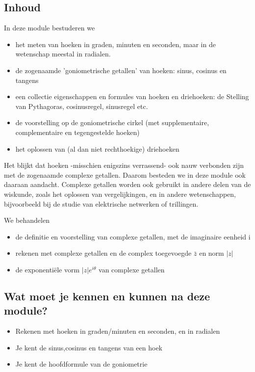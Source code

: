 \documentclass{ximera}
\begin{document}
\subsection{Inhoud}
\begin{expandable}
In deze module bestuderen we 
	\begin{itemize}
		\item het meten van hoeken in graden, minuten en seconden, maar in de wetenschap meestal in radialen.
        	\item de zogenaamde 'goniometrische getallen' van hoeken: sinus, cosinus en tangens
	    	\item een collectie eigenschappen en formules van hoeken en driehoeken: de Stelling van Pythagoras, cosinusregel, sinusregel etc.
        	\item de voorstelling op de goniometrische cirkel (met supplementaire, complementaire en tegengestelde hoeken)
	   	\item het oplossen van (al dan niet rechthoekige) driehoeken
	\end{itemize}

Het blijkt dat hoeken -misschien enigszins verrassend-  ook nauw verbonden zijn met de zogenaamde complexe getallen. Daarom besteden we in deze module ook daaraan aandacht. Complexe getallen worden ook gebruikt in andere delen van de wiskunde, zoals het oplossen van vergelijkingen, en in andere wetenschappen, bijvoorbeeld bij de studie van elektrische netwerken of trillingen.

We behandelen
	\begin{itemize}
		\item de definitie en voorstelling van complexe getallen, met de imaginaire eenheid i
		\item rekenen met complexe getallen en de complex toegevoegde $\bar{z}$ en norm $|z|$
		\item de exponentiële vorm $|z|e^{i\theta}$ van complexe getallen
	\end{itemize}
\end{expandable}

\subsection{Wat moet je kennen en kunnen na deze module?}

\begin{expandable}
	\begin{itemize}
		\item Rekenen met hoeken in graden/minuten en seconden, en in radialen
		\item Je kent de sinus,cosinus en tangens van een hoek
		\item Je kent de hoofdformule van de goniometrie
	\end{itemize}
\end{expandable}
\end{document}
